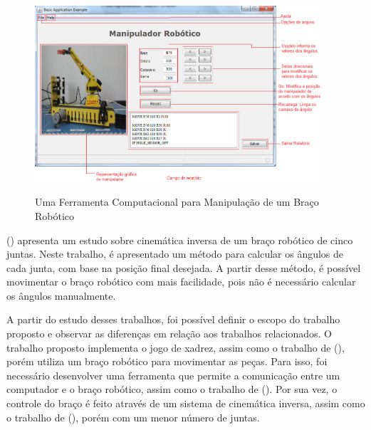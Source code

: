 \begin{figure}[H]
    \centering
    \caption{Uma Ferramenta Computacional para Manipulação de um Braço Robótico}
    \includegraphics[keepaspectratio=true, width=0.95\textwidth]
    	{img/ferramenta-computacional.jpg}
    \label{fig:ferramentaComputacional}
\end{figure}

\citeauthor{inverse_kinematics_five_joint} (\citeyear{inverse_kinematics_five_joint}) apresenta um estudo sobre cinemática inversa de um braço robótico de cinco juntas.
Neste trabalho, é apresentado um método para calcular os ângulos de cada junta, com base na posição final desejada.
A partir desse método, é possível movimentar o braço robótico com mais facilidade, pois não é necessário calcular os ângulos manualmente.

A partir do estudo desses trabalhos, foi possível definir o escopo do trabalho proposto e observar as diferenças em relação aos trabalhos relacionados.
O trabalho proposto implementa o jogo de xadrez, assim como o trabalho de \citeauthor{jogador_xadrez} (\citeyear{jogador_xadrez}), porém utiliza um braço robótico para movimentar as peças.
Para isso, foi necessário desenvolver uma ferramenta que permite a comunicação entre um computador e o braço robótico, assim como o trabalho de \citeauthor{ferramenta_braco_robotico} (\citeyear{ferramenta_braco_robotico}). 
Por sua vez, o controle do braço é feito através de um sistema de cinemática inversa, assim como o trabalho de \citeauthor{inverse_kinematics_five_joint} (\citeyear{inverse_kinematics_five_joint}), porém com um menor número de juntas.